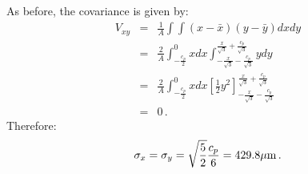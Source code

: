 As before, the covariance is given by:
\begin{eqnarray}
  V_{xy} &=& \frac{1}{A} \int \int (x-\bar{x}) (y-\bar{y}) dx dy         \\
        &=& \frac{2}{A}  \int_{-\frac{c_p}{2}}^{0} x dx 
            \int_{-\frac{x}{\sqrt{3}}-\frac{c_p}{\sqrt{3}}}
                ^{\frac{x}{\sqrt{3}}+\frac{c_p}{\sqrt{3}}} y dy \nonumber \\
        &=& \frac{2}{A}  \int_{-\frac{c_p}{2}}^{0} x dx 
            \left[
             \frac{1}{2} y^2
            \right]_{-\frac{x}{\sqrt{3}}-\frac{c_p}{\sqrt{3}}}
                   ^{\frac{x}{\sqrt{3}}+\frac{c_p}{\sqrt{3}}}   \nonumber \\
        &=& 0 \, .
\end{eqnarray}
Therefore:
\begin{equation}
  \sigma_{x}=\sigma_{y}=\sqrt{\frac{5}{2}}\frac{c_p}{6} = 429.8 \mu{\rm m} \, .
\end{equation}

